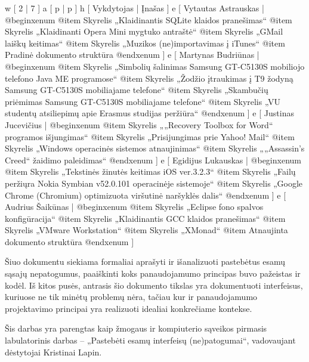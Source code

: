 
\xtable
{
  w [ 2  | 7 ]
  a [ p  | p ]
  h [ Vykdytojas | Įnašas ]
  e [ Vytautas Astrauskas 
  | @begin{xenum} 
      @item Skyrelis „Klaidinantis SQLite klaidos pranešimas“
      @item Skyrelis „Klaidinanti Opera Mini mygtuko antraštė“ 
      @item Skyrelis „GMail laiškų keitimas“
      @item Skyrelis „Muzikos (ne)importavimas į iTunes“
      @item Pradinė dokumento struktūra
    @end{xenum}
  ]
  e [ Martynas Budriūnas
  | @begin{xenum} 
      @item Skyrelis „Simbolių šalinimas Samsung GT-C5130S mobiliojo telefono Java ME programose“
      @item Skyrelis „Žodžio įtraukimas į T9 žodyną Samsung GT-C5130S mobiliajame telefone“
      @item Skyrelis „Skambučių priėmimas Samsung GT-C5130S mobiliajame telefone“
      @item Skyrelis „VU studentų atsiliepimų apie Erasmus studijas peržiūra“
    @end{xenum}
  ]
  e [ Justinas Jucevičius 
  | @begin{xenum} 
      @item Skyrelis „„Recovery Toolbox for Word“ programos išjungimas“
      @item Skyrelis „Prisijungimas prie Yahoo! Mail“
      @item Skyrelis „Windows operacinės sistemos atnaujinimas“
      @item Skyrelis „„Assassin's Creed“ žaidimo paleidimas“
    @end{xenum}
  ]
  e [ Egidijus Lukauskas 
  | @begin{xenum} 
      @item Skyrelis „Tekstinės žinutės keitimas iOS ver.3.2.3“
      @item Skyrelis „Failų peržiųra Nokia Symbian v52.0.101 operacinėje sistemoje“
      @item Skyrelis „Google Chrome (Chromium) optimizuota viršutinė naršyklės dalis“
    @end{xenum}
  ]
  e [ Audrius Šaikūnas 
  | @begin{xenum} 
      @item Skyrelis „Eclipse fono spalvos konfigūracija“
      @item Skyrelis „Klaidinantis GCC klaidos pranešimas“ 
      @item Skyrelis „VMware Workstation“
      @item Skyrelis „XMonad“
      @item Atnaujinta dokumento struktūra
    @end{xenum}
  ]
}

Šiuo dokumentu siekiama formaliai aprašyti ir išanalizuoti pastebėtus esamų sąsajų nepatogumus,
paaiškinti koks panaudojamumo principas buvo pažeistas ir kodėl. Iš kitos pusės, antrasis šio
dokumento tikslas yra dokumentuoti interfeisus, kuriuose ne tik minėtų problemų nėra, tačiau kur
ir panaudojamumo projektavimo principai yra realizuoti idealiai konkrečiame kontekse.

Šis darbas yra parengtas kaip žmogaus ir kompiuterio sąveikos pirmasis labulatorinis darbas
– „Pastebėti esamų interfeisų (ne)patogumai“, vadovaujant dėstytojai Kristinai Lapin.
